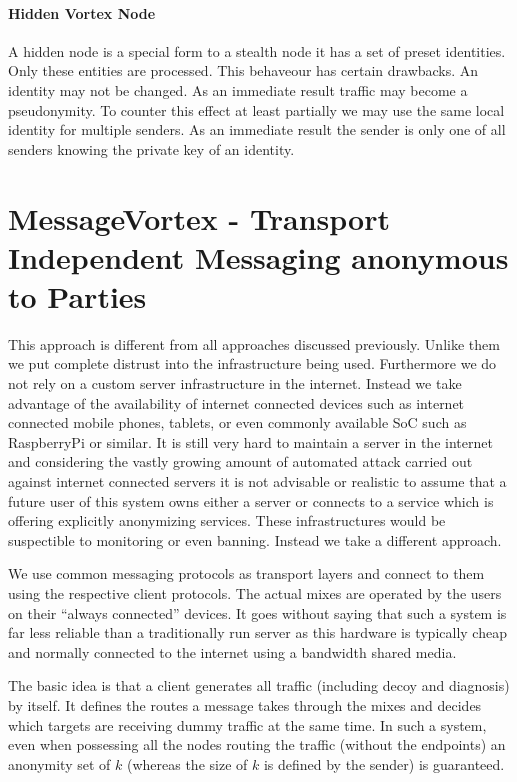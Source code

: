 \subsubsection{Hidden Vortex Node\label{sec:hiddenNode}}
A hidden node is a special form to a stealth node it has a set of preset identities. Only these entities are processed. This behaveour has certain drawbacks. An identity may not be changed. As an immediate result traffic may become a pseudonymity. To counter this effect at least partially we may use the same local identity for multiple senders. As an immediate result the sender is only one of all senders knowing the private key of an identity.

\chapter{MessageVortex - Transport Independent Messaging anonymous to  Parties\label{sec:spec}}
This approach is different from all approaches discussed previously. Unlike them we put complete distrust into the infrastructure being used. Furthermore we do not rely on a custom server infrastructure in the internet. Instead we take advantage of the availability of internet connected devices such as internet connected mobile phones, tablets, or even commonly available SoC such as RaspberryPi or similar. It is still very hard to maintain a server in the internet and considering the vastly growing amount of automated attack carried out against internet connected servers it is not advisable or realistic to assume that a future user of this system owns either a server or connects to a service which is offering explicitly anonymizing services. These infrastructures would be suspectible to monitoring or even banning. Instead we take a different approach.

We use common messaging protocols as transport layers and connect to them using the respective client protocols. The actual mixes are operated by the users on their ``always connected'' devices. It goes without saying that such a system is far less reliable than a traditionally run server as this hardware is typically cheap and normally connected to the internet using a bandwidth shared media.

The basic idea is that a client generates all traffic (including decoy and diagnosis) by itself. It defines the routes a message takes through the mixes and decides which targets are receiving dummy traffic at the same time. In such a system, even when possessing all the nodes routing the traffic (without the endpoints) an anonymity set of $k$ (whereas the size of $k$ is defined by the sender) is guaranteed.

